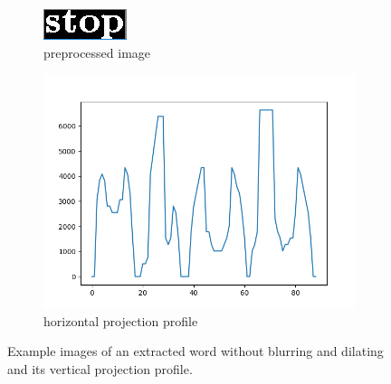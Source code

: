 \documentclass[english, paper=a4]{scrartcl}
\begin{document}
\begin{figure}
	\centering
	\begin{subfigure}{0.40\textwidth}
		\includegraphics[width=\textwidth]{PreprocessedWord.PNG}
		\caption{preprocessed image}
		\label{fig:ex2a}
	\end{subfigure}
	\begin{subfigure}{0.40\textwidth}
		\includegraphics[width=\textwidth]{VertProjectionChar.PNG}
		\caption{horizontal projection profile}
		\label{fig:ex2b}
	\end{subfigure}
	\caption{Example images of an extracted word without blurring and dilating and its vertical projection profile.}
	\label{fig:ex_proj_vert_char}
\end{figure}
\end{document}
